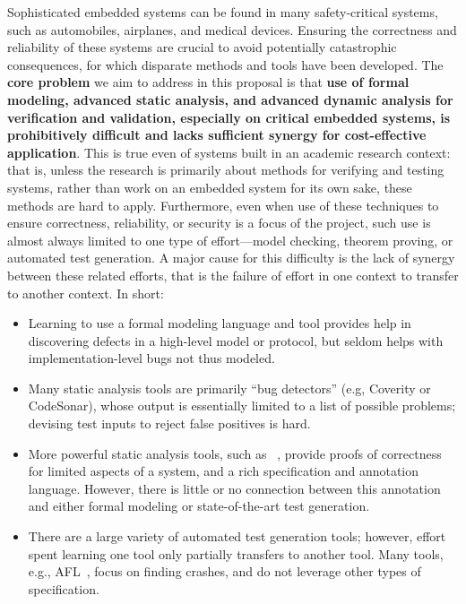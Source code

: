 Sophisticated embedded systems can be found in many safety-critical systems, such as automobiles, airplanes, and medical devices.
Ensuring the correctness and reliability of these systems are crucial to avoid potentially catastrophic consequences, for which disparate methods and tools have been developed.
The \textbf{core problem} we aim to address in this proposal is that \textbf{use of formal modeling, advanced static analysis, and advanced dynamic analysis for verification and validation, especially on critical embedded systems, is prohibitively difficult and lacks sufficient synergy for cost-effective application}.
This is true even of systems built in an academic research context: that is, unless the research is primarily about methods for verifying and testing systems, rather than work on an embedded system for its own sake, these methods are hard to apply.
Furthermore, even when use of these techniques to ensure correctness, reliability, or security is a focus of the project, such use is almost always limited to one type of effort---model checking, theorem proving, or automated test generation.
A major cause for this difficulty is the lack of synergy between these related efforts, that is the failure of effort in one context to transfer to another context.
In short:

\begin{itemize}[labelsep=3pt,leftmargin=12pt]
\item Learning to use a formal modeling language and tool
 provides help in discovering defects in a high-level model or protocol, but seldom helps with implementation-level bugs not thus modeled.
\item Many static analysis tools are primarily ``bug detectors'' (e.g, Coverity or CodeSonar), whose output is essentially limited to a list of possible problems; devising test inputs to reject false positives is hard.
\item More powerful static analysis tools, such as \framac~\cite{KKP2015:FAC}, provide proofs of correctness for limited aspects of a system, and a rich specification and annotation language.  However, there is little or no connection between this annotation and either formal modeling or state-of-the-art test generation.
\item There are a large variety of automated test generation tools; however, effort spent learning one tool only partially transfers to another tool.  Many tools, e.g., AFL~\cite{aflfuzz}, focus on finding crashes, and do not leverage  other types of specification.
\end{itemize}

